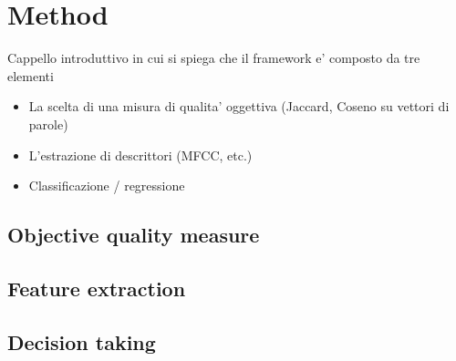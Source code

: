 \section{Method}\label{sec:method}

Cappello introduttivo in cui si spiega che il framework e' composto da tre elementi
\begin{itemize}
	\item La scelta di una misura di qualita' oggettiva (Jaccard, Coseno su vettori di parole)
	\item L'estrazione di descrittori (MFCC, etc.)
	\item Classificazione / regressione
\end{itemize}

\subsection{Objective quality measure}

\subsection{Feature extraction}

\subsection{Decision taking}
